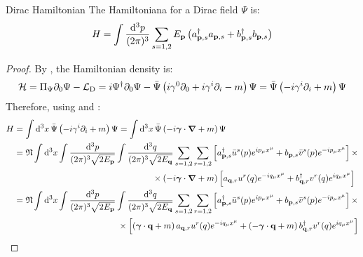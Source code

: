 \begin{proposition}{Dirac Hamiltonian}{}
  The Hamiltoniana for a Dirac field $ \Psi $ is:
  \begin{equation}
    H = \int \frac{\mathrm{d}^3p}{(2\pi)^3} \sum_{s = 1,2} E_{\mathbf{p}} \left( a_{\mathbf{p},s}^\dagger a_{\mathbf{p},s} + b_{\mathbf{p},s}^\dagger b_{\mathbf{p},s} \right)
  \end{equation}
\end{proposition}

\begin{proofbox}
  \begin{proof}
    By , the Hamiltonian density is:
    \begin{equation*}
      \mathcal{H} = \Pi_\Psi \partial_0 \Psi - \mathcal{L}_\text{D} = i \Psi^\dagger \partial_0 \Psi - \bar{\Psi} \left( i \gamma^0 \partial_0 + i \gamma^i \partial_i - m \right) \Psi = \bar{\Psi} \left( -i \gamma^i \partial_i + m \right) \Psi
    \end{equation*}
    Therefore, using  and :
    \begin{equation*}
      \begin{split}
        H
        &= \int \dd^3x\, \bar{\Psi} \left( -i \gamma^i \pa_i + m \right) \Psi = \int \dd^3x\, \bar{\Psi} \left( -i \bs{\gamma} \cdot \bs{\nabla} + m \right) \Psi \\
        &= \normord \int \dd^3x \int \frac{\dd^3p}{(2\pi)^3 \sqrt{2E_\ve{p}}} \int \frac{\dd^3q}{(2\pi)^3 \sqrt{2E_\ve{q}}} \sum_{s = 1,2} \sum_{r = 1,2} \left[ a_{\ve{p},s}^\dagger \bar{u}^s(p) e^{ip_\mu x^\mu} + b_{\ve{p},s} \bar{v}^s(p) e^{-ip_\mu x^\mu} \right] \times \\
        & \qquad \qquad \qquad \qquad \qquad \qquad \qquad \qquad \times \left( -i \bs{\gamma} \cdot \bs{\nabla} + m \right) \left[ a_{\ve{q},r} u^r(q) e^{-iq_\mu x^\mu} + b_{\ve{q},r}^\dagger v^r(q) e^{iq_\mu x^\mu} \right] \\
        &= \normord \int \dd^3x \int \frac{\dd^3p}{(2\pi)^3 \sqrt{2E_\ve{p}}} \int \frac{\dd^3q}{(2\pi)^3 \sqrt{2E_\ve{q}}} \sum_{s = 1,2} \sum_{r = 1,2} \left[ a_{\ve{p},s}^\dagger \bar{u}^s(p) e^{i p_\mu x^\mu} + b_{\ve{p},s} \bar{v}^s(p) e^{-i p_\mu x^\mu} \right] \times \\
        & \qquad \qquad \qquad \qquad \qquad \qquad \times \left[ \left( \bs{\gamma} \cdot \ve{q} + m \right) a_{\ve{q},r} u^r(q) e^{-i q_\mu x^\mu} + \left( - \bs{\gamma} \cdot \ve{q} + m \right) b_{\ve{q},r}^\dagger v^r(q) e^{i q_\mu x^\mu} \right]
      \end{split}

\end{equation*}
\end{proof}
\end{proofbox}
